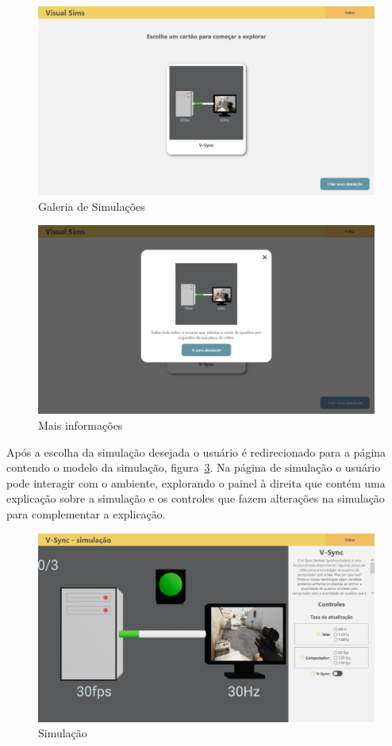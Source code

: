 \documentclass[tcc,capa]{texufpel}
\begin{document}
\begin{figure}[htbp]
  \centering \includegraphics[scale=.2]{Navegacao/pagina_galeria.jpeg}
  \caption{Galeria de Simulações}
  \label{galeria}
\end{figure}

\begin{figure}[htbp]
  \centering \includegraphics[scale=.2]{Navegacao/card_galeria.jpeg}
  \caption{Mais informações}
  \label{card_galeria}
\end{figure}

Após a escolha da simulação desejada o usuário é redirecionado para a página contendo o modelo da simulação, figura~\ref{simulacao}. Na página de simulação o usuário pode interagir com o ambiente, explorando o painel à direita que contém uma explicação sobre a simulação e os controles que fazem alterações na simulação para complementar a explicação. 

\begin{figure}[htbp]
  \centering \includegraphics[scale=.2]{Navegacao/pagina_simulacao.jpeg}
  \caption{Simulação}
  \label{simulacao}
\end{figure}
\end{document}
